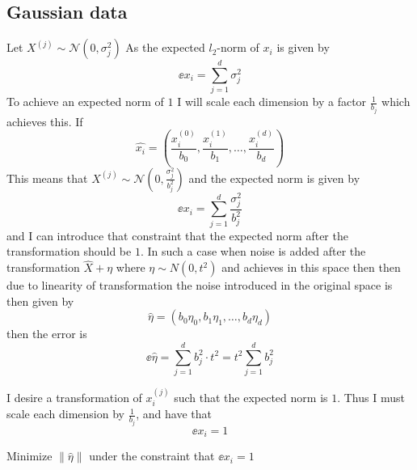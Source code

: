 \documentclass[a4paper,12pt]{article}
\begin{document}
\subsection{Gaussian data}
Let $X^{(j)} \sim \mathcal{N}(0, \sigma_j^2)$ 
As the expected $l_2$-norm of $x_i$ is given by
\[
    \ee{x_i} = \sum_{j=1}^d \sigma_j^2
\]
To achieve an expected norm of $1$ I will scale 
each dimension by a factor $\frac{1}{b_j}$ which achieves this.
If 
\[
\hat{x_i} = \left( \frac{x_i^{(0)}}{b_0}, \frac{x_i^{(1)}}{b_1}, \dots, \frac{x_i^{(d)}}{b_d} \right)
\]
This means that $X^{(j)} \sim \mathcal{N}(0,\frac{\sigma_j^2}{b_j^2})$ 
and the expected norm is given by 
\[
    \ee{x_i} = \sum_{j=1}^d \frac{\sigma_j^2}{b_j^2}
\]
and I can introduce that constraint that the expected norm
after the transformation should be $1$.
In such a case when noise is added after the transformation
$\hat{X} + \eta$
where $\eta \sim N(0, t^2)$ and achieves \edp in this space
then then due to linearity of transformation the noise 
introduced in the original space is then given by
\[
    \hat{\eta} = \left( b_0\eta_0,b_1\eta_1, \dots, b_d\eta_d \right)
\]
then the error is
\[
    \ee{\hat{\eta}} = \sum_{j=1}^d b_j^2 \cdot t^2 = t^2 \sum_{j=1}^d b_j^2
\] 





I desire a transformation of $x_i^{(j)}$ such that the 
expected norm is $1$. Thus I must scale each dimension by
$\frac{1}{b_j}$, and have that 
\[
    \ee{x_i} = 1
\]

Minimize $\| \hat{\eta} \|$ under the constraint that $\ee{x_i} = 1$  
\end{document}
